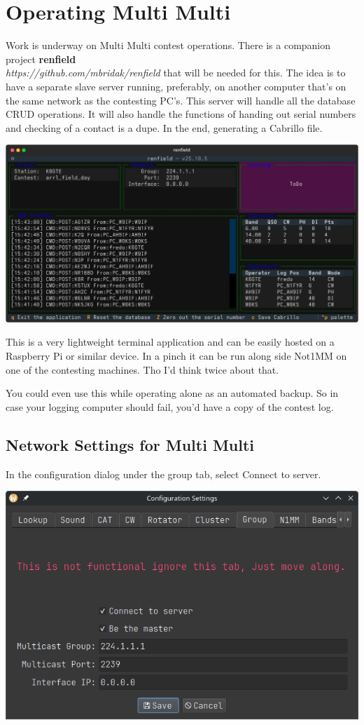 \documentclass{article}
\begin{document}
\section{Operating Multi Multi}

Work is underway on Multi Multi contest operations. There is a companion project \textbf{renfield}\\
\emph{https://github.com/mbridak/renfield} that will be needed for this. The idea is to have a separate slave server running, preferably, on another computer that's on the same network as the contesting PC's. This server will handle all the database CRUD operations. It will also handle the functions of handing out serial numbers and checking of a contact is a dupe. In the end, generating a Cabrillo file.

\vspace{0.5cm}
\begin{center}
\includegraphics[width=0.75\linewidth]{pic/renfield_cli.png}
\end{center}
\vspace{0.5cm}

This is a very lightweight terminal application and can be easily hosted on a Raspberry Pi or similar device. In a pinch it can be run along side Not1MM on one of the contesting machines. Tho I'd think twice about that.

You could even use this while operating alone as an automated backup. So in case your logging computer should fail, you'd have a copy of the contest log.
\subsection{Network Settings for Multi Multi}
In the configuration dialog under the group tab, select Connect to server.

\vspace{0.5cm}
\begin{center}
\includegraphics[width=0.5\linewidth]{pic/configuration_group.png}
\end{center}
\vspace{0.5cm}
\end{document}
